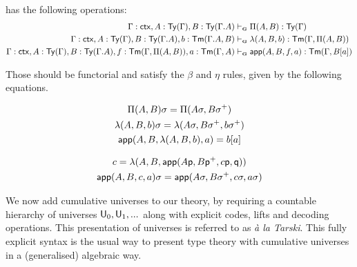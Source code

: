 \begin{definition}
    \ThyGAT has the following operations:
     \begin{align*}
         \Gamma : \ctx, A : \Type(\Gamma), B : \Type(\Gamma.A) &\vdashG \Pi(A,B) : \Type(\Gamma)\\
         \Gamma : \ctx, A : \Type(\Gamma), B : \Type(\Gamma.A), b : \Elem(\Gamma.A,B) &\vdashG \lambda(A,B,b) : \Elem(\Gamma,\Pi(A,B))\\
         \Gamma : \ctx, A : \Type(\Gamma), B : \Type(\Gamma.A), f : \Elem(\Gamma, \Pi(A,B)), a : \Elem(\Gamma,A) &\vdashG \app(A,B,f,a) : \Elem(\Gamma,B[a])
     \end{align*}

    Those should be functorial and satisfy the $\beta$ and $\eta$ rules, given by the following equations.
    \noindent
    \begin{minipage}{0.30\linewidth}
        \begin{gather*}
            \Pi(A, B)\sigma = \Pi(A\sigma, B \sigma^+)\\
            \lambda(A,B,b)\sigma = \lambda(A\sigma,B\sigma^+,b\sigma^+)\\
            \mathsf{app}(A,B,\lambda(A,B,b),a) = b[a]
        \end{gather*}
    \end{minipage}
    \hfill
    \begin{minipage}{0.50\linewidth}
        \begin{gather*}
            c = \lambda(A,B, \mathsf{app}(A\mathsf{p},B\mathsf{p}^+,c\mathsf{p},\mathsf{q}))\\
            \mathsf{app}(A,B,c,a)\sigma = \mathsf{app}(A\sigma,B\sigma^+,c\sigma,a\sigma)
        \end{gather*}
    \end{minipage}

\end{definition}

We now add cumulative universes to our theory, by requiring a countable hierarchy of universes $\mathsf{U}_0, \mathsf{U}_1,...$
along with explicit codes, lifts and decoding operations. This presentation of universes is referred to as \textit{à la Tarski}.
This fully explicit syntax is the usual way to present type theory with cumulative universes in a (generalised) algebraic way.

